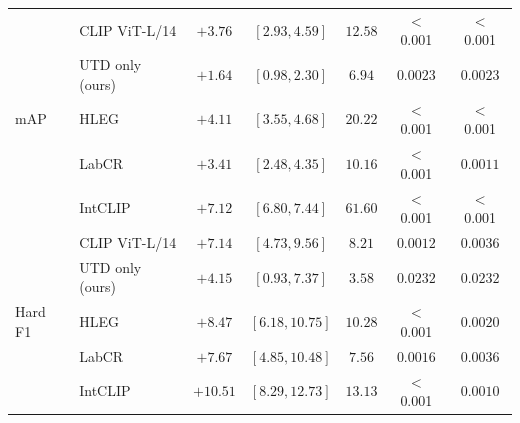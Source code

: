 \begin{tabular}{llccccc}
\hline
\multirow{5}{*}{mAP}
& CLIP ViT-L/14 & $+3.76$ & $[2.93, 4.59]$ & $12.58$ & $<$0.001 & $<$0.001 \\
& UTD only (ours) & $+1.64$ & $[0.98, 2.30]$ & $6.94$ & $0.0023$ & $0.0023$ \\
& HLEG & $+4.11$ & $[3.55, 4.68]$ & $20.22$ & $<$0.001 & $<$0.001 \\
& LabCR & $+3.41$ & $[2.48, 4.35]$ & $10.16$ & $<$0.001 & $0.0011$ \\
& IntCLIP & $+7.12$ & $[6.80, 7.44]$ & $61.60$ & $<$0.001 & $<$0.001 \\
\hline
\multirow{5}{*}{Hard F1}
& CLIP ViT-L/14 & $+7.14$ & $[4.73, 9.56]$ & $8.21$ & $0.0012$ & $0.0036$ \\
& UTD only (ours) & $+4.15$ & $[0.93, 7.37]$ & $3.58$ & $0.0232$ & $0.0232$ \\
& HLEG & $+8.47$ & $[6.18, 10.75]$ & $10.28$ & $<$0.001 & $0.0020$ \\
& LabCR & $+7.67$ & $[4.85, 10.48]$ & $7.56$ & $0.0016$ & $0.0036$ \\
& IntCLIP & $+10.51$ & $[8.29, 12.73]$ & $13.13$ & $<$0.001 & $0.0010$ \\
\hline
\end{tabular}
